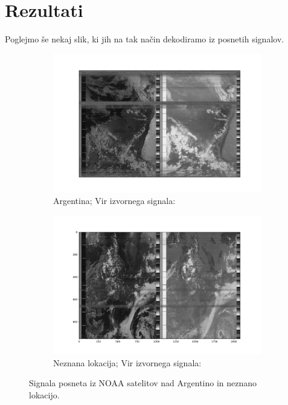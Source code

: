 \documentclass{article}
\begin{document}
\section{Rezultati}
Poglejmo še nekaj slik, ki jih na tak način dekodiramo iz posnetih signalov. 
\begin{figure}[H]
    \centering
    \begin{subfigure}[b]{0.49\textwidth}
        \centering
        \includegraphics[width=\textwidth]{argentina.pdf}
		\caption{Argentina; Vir izvornega signala: \cite{bernardi}}
    \end{subfigure}
    \hfill
    \begin{subfigure}[b]{0.49\textwidth}
        \centering
        \includegraphics[width=\textwidth]{thirdnoaa.pdf}
		\caption{Neznana lokacija; Vir izvornega signala: \cite{0jk6}}
    \end{subfigure}

	\caption{Signala posneta iz NOAA satelitov nad Argentino in neznano lokacijo.}
    \label{fig:out_example}
\end{figure}
\end{document}
